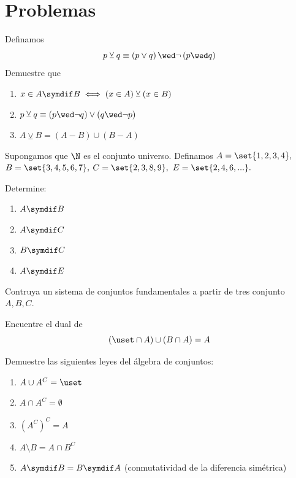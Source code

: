 \section*{Problemas}



\begin{problema}
	Definamos $$p\veebar q \equiv \left( p \vee q \right) \wed \neg\left( p \wed q \right)$$
	Demuestre que 
	\begin{enumerate}
		\item $ \displaystyle
		x \in A\symdif B \iff \left( x \in A \right) \veebar \left( x \in B  \right)
		$ 
		\item $\displaystyle p\veebar q \equiv \left( p \wed \neg q \right) \vee \left( q \wed \neg p \right)$ 
		\item $\displaystyle A \veebar B = \left( A \minus B \right) \cup \left( B \minus A \right)$
	\end{enumerate}
	
\end{problema}

\begin{problema}
	\label{lip:exmp:1.5}
	Supongamos que $\N$ es el conjunto universo. Definamos $A=\set{1,2,3,4},$ $B=\set{3,4,5,6,7},$ $C=\set{2,3,8,9},$ $E=\set{2,4,6,...}.$
	
	Determine:
	\begin{enumerate}
		\item $A \symdif B$ 
		\item $A \symdif C$ 
		\item $B \symdif C$ 
		\item $A \symdif E$
	\end{enumerate}
\end{problema}


\begin{problema}
	\label{lip:exmo:1.6}
	Contruya un sistema de conjuntos fundamentales a partir de tres conjunto $A, B, C.$  
\end{problema}


\begin{problema}
	Encuentre el dual de 
	\[ (\uset \cap A) \cup (B\cap A) = A\]
\end{problema}

\begin{problema}
	Demuestre las siguientes leyes del álgebra de conjuntos:
	\begin{enumerate}
		\item $A \cup A^{C} = \uset$
		\item $A \cap A^{C} = \emptyset$
		\item $(A^{C})^{C} = A$
		\item $A \setminus B = A \cap B^{C}$
		\item $A \symdif B = B \symdif A$ (conmutatividad de la diferencia simétrica)
	\end{enumerate}
\end{problema}

